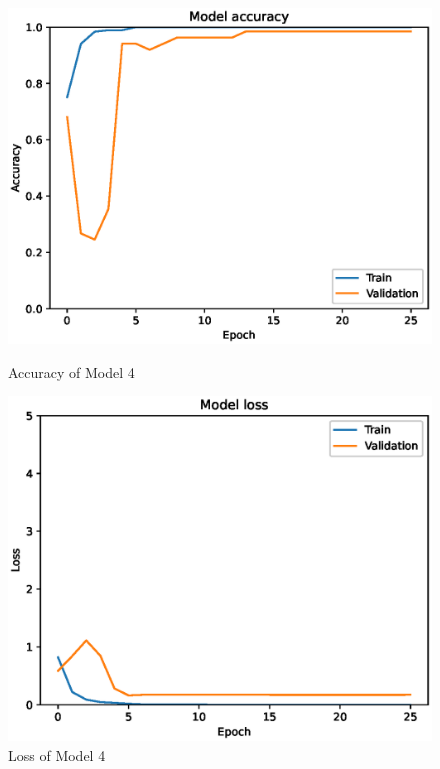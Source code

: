 \begin{figure}[H]
    \centering
    \begin{minipage}{0.45\textwidth}
        \centering
        \includegraphics[width=\textwidth]{./fig/model4/accuracy4.eps}
        \caption{Accuracy of Model 4}
        \label{fig:model4_accuracy}
    \end{minipage}
    \begin{minipage}{0.45\textwidth}
        \centering
        \includegraphics[width=\textwidth]{./fig/model4/loss4.eps}
        \caption{Loss of Model 4}
        \label{fig:model4_loss}
    \end{minipage}
\end{figure}

